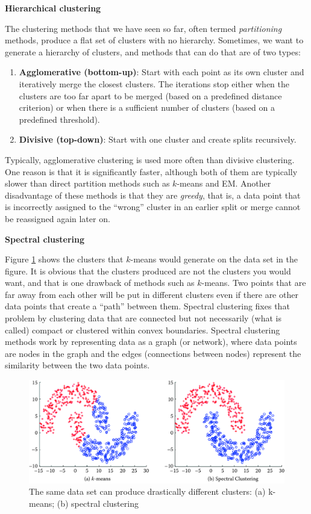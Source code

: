\documentclass[]{krantz}
\begin{document}
\textbf{Hierarchical clustering}

The clustering methods that we have seen so far, often termed
\emph{partitioning} methods, produce a flat set of clusters with no
hierarchy. Sometimes, we want to generate a hierarchy of clusters, and
methods that can do that are of two types:

\begin{enumerate}
\def\labelenumi{\arabic{enumi}.}
\item
  \textbf{Agglomerative (bottom-up)}: Start with each point as its own
  cluster and iteratively merge the closest clusters. The iterations
  stop either when the clusters are too far apart to be merged (based on
  a predefined distance criterion) or when there is a sufficient number
  of clusters (based on a predefined threshold).
\item
  \textbf{Divisive (top-down)}: Start with one cluster and create splits
  recursively.
\end{enumerate}

Typically, agglomerative clustering is used more often than divisive
clustering. One reason is that it is significantly faster, although both
of them are typically slower than direct partition methods such as
\(k\)-means and EM. Another disadvantage of these methods is that they
are \emph{greedy}, that is, a data point that is incorrectly assigned to
the ``wrong'' cluster in an earlier split or merge cannot be reassigned
again later on.

\textbf{Spectral clustering}

Figure \ref{fig:spectral} shows the clusters that \(k\)-means would
generate on the data set in the figure. It is obvious that the clusters
produced are not the clusters you would want, and that is one drawback
of methods such as \(k\)-means. Two points that are far away from each
other will be put in different clusters even if there are other data
points that create a ``path'' between them. Spectral clustering fixes
that problem by clustering data that are connected but not necessarily
(what is called) compact or clustered within convex boundaries. Spectral
clustering methods work by representing data as a graph (or network),
where data points are nodes in the graph and the edges (connections
between nodes) represent the similarity between the two data points.

\begin{figure}

{\centering \includegraphics[width=0.7\linewidth]{ChapterML/figures/spectral} 

}

\caption{The same data set can produce drastically different clusters: (a) k-means; (b) spectral clustering}\label{fig:spectral}
\end{figure}
\end{document}
